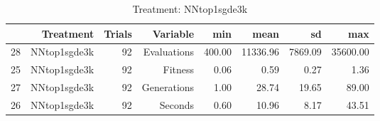 \begin{table}[ht]
\centering
\begin{tabular}{rrrrrrrr}
  \hline
 & Treatment & Trials & Variable & min & mean & sd & max \\ 
  \hline
28 & NNtop1sgde3k &  92 & Evaluations & 400.00 & 11336.96 & 7869.09 & 35600.00 \\ 
  25 & NNtop1sgde3k &  92 & Fitness & 0.06 & 0.59 & 0.27 & 1.36 \\ 
  27 & NNtop1sgde3k &  92 & Generations & 1.00 & 28.74 & 19.65 & 89.00 \\ 
  26 & NNtop1sgde3k &  92 & Seconds & 0.60 & 10.96 & 8.17 & 43.51 \\ 
   \hline
\end{tabular}
\caption{Treatment: NNtop1sgde3k} 
\end{table}
